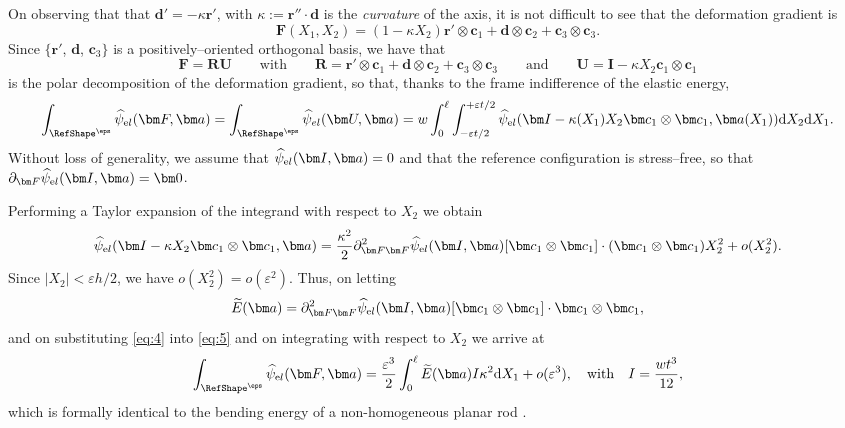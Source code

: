 \documentclass[oneside]{article}
\begin{document}
			On observing that that $\bm d'=-\kappa\bm r'$, with $\kappa:=\bm r''\cdot\bm d$ is the \emph{curvature} of the axis, it is not difficult to see that the deformation gradient is
			\begin{equation}\label{eq:2}
			\bm F(X_1,X_2)=(1-\kappa X_2)\bm r'\otimes\bm c_1+\bm d\otimes\bm c_2+\bm c_3\otimes\bm c_3.
			\end{equation}
			Since $\{\bm r'$, $\bm d$, $\bm c_3\}$ is a positively--oriented orthogonal basis, we have that 
			\begin{equation}\label{eq:3-3}
			\bm F=\bm R\bm U\qquad\text{with}\qquad\bm R=\bm r'\otimes\bm c_1+\bm d\otimes\bm c_2+\bm c_3\otimes\bm c_3\qquad\text{and}\qquad\bm U=\bm I-\kappa X_2\bm c_1\otimes\bm c_1
			\end{equation}
			is the polar decomposition of the deformation gradient, so that, thanks to the frame indifference of the elastic energy,
			\begin{equation}\label{eq:5}
			\int_{\mathcal \RefShape^\eps}\widehat\psi_{\text el}(\bm F,\bm a)=\int_{\mathcal \RefShape^\eps}\widehat\psi_{el}(\bm U,\bm a)=w\int_0^\ell \int_{-\varepsilon t/2}^{+\varepsilon t/2}\widehat\psi_{\text el}(\bm I-\kappa(X_1) X_2\bm c_1\otimes\bm c_1,\bm a(X_1)){\text d} X_2{\text d} X_1.
			\end{equation}
			Without loss of generality, we assume that $\widehat\psi_{\text el}(\bm I,\bm a)=0$ and that the reference configuration is stress--free, so that $\partial_{\bm F}\widehat\psi_{\text el}(\bm I,\bm a)=\bm 0$.
			
			Performing a Taylor expansion of the integrand with respect to $X_2$ we obtain
			\begin{equation}\label{eq:4}
			\widehat\psi_{\text el}(\bm I-\kappa X_2\bm c_1\otimes\bm c_1,\bm a)=\frac {\kappa^2}2 \partial^2_{\bm F\bm F}\widehat\psi_{\text el}(\bm I,\bm a)[\bm c_1\otimes\bm c_1]\cdot(\bm c_1\otimes\bm c_1)X_2^2+o(X_2^2).
			\end{equation}
			Since $|X_2|<\varepsilon h/2$, we have $o(X_2^2)=o(\varepsilon^2)$. Thus, on letting
			\begin{equation}
			\widetilde E(\bm a)=\partial^2_{\bm F\bm F}\widehat\psi_{\text el}(\bm I,\bm a)[\bm c_1\otimes\bm c_1]\cdot\bm c_1\otimes\bm c_1,
			\end{equation}
			and on substituting \eqref{eq:4} into  \eqref{eq:5} and on integrating with respect to $X_2$ we arrive at
			\begin{equation}\label{psiel}
			\int_{\mathcal \RefShape^\eps}\widehat\psi_{\text el}(\bm F,\bm a)=\frac{\varepsilon^3}{2}\int_0^\ell \widetilde E(\bm a)I\kappa^2{\text d}X_1+o(\varepsilon^3),\quad\text{with}\quad I=\frac {wt ^3}{12},
			\end{equation}
			which is formally identical to the bending energy of a  non-homogeneous planar rod \cite{Antman2005}. 
			
\end{document}
